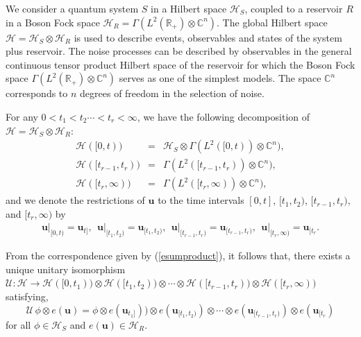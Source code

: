 We consider a quantum system $S$  in a Hilbert space $\mathcal{H}_S$, coupled to a reservoir $R$ in a Boson Fock space $\mathcal{H}_R = \Gamma (L^2 (\mathbb{R}_+) \otimes \mathbb{C}^n)$.  The global Hilbert space $\mathcal{H}=\mathcal{H}_S\otimes\mathcal{H}_R$ is used to describe events, observables and states of the system plus reservoir. The noise processes can be described by observables in the general continuous tensor product Hilbert space of the reservoir for which  the Boson Fock space $\Gamma (L^2 (\mathbb{R}_+)\otimes \mathbb{C}^n)$ serves as one of the simplest models. The space $\mathbb{C}^n$ corresponds to $n$ degrees of freedom in the selection of noise. 

For any $0<t_1<t_2\cdots <t_r<\infty$, we have the following decomposition of $\mathcal{H}=\mathcal{H}_S\otimes \mathcal{H}_R$: 
\begin{eqnarray*}
	\mathcal{H}([0,t))&=&\mathcal{H}_S\otimes \Gamma(L^2([0,t))\otimes \mathbb{C}^n),   \\
	\mathcal{H}([t_{r-1},t_{r})) &=& \Gamma(L^2([t_{r-1},t_{r}))\otimes \mathbb{C}^n), \\
	\mathcal{H}([t_r,\infty)) &=& \Gamma(L^2([t_r,\infty))\otimes \mathbb{C}^n), 														
\end{eqnarray*} 
and we denote the restrictions of $\mathbf{u}$ to the time intervals $[0,t]$, $[t_1,t_2)$, $[t_{r-1},t_{r})$, and $[t_r,\infty)$ by 
\begin{eqnarray*}
	\left.\mathbf{u}\right\vert_{[0,t)}=\mathbf{u}_{t]},  \ \  \left.\mathbf{u}\right\vert_{[t_1,t_2)}=\mathbf{u}_{[t_{1},t_{2})},  \ \ 
	\left.\mathbf{u}\right\vert_{[t_{r-1},t_{r})}=\mathbf{u}_{[t_{r-1},t_{r})},  \ \ 
	\left.\mathbf{u}\right\vert_{[t_r,\infty)}=\mathbf{u}_{[t_r}.
\end{eqnarray*} 

From the correspondence given by (\ref{esumproduct}), it follows that, there exists a unique unitary isomorphism $\mathcal{U}: \mathcal{H} \rightarrow \mathcal{H}([0,t_{1})) \otimes 
\mathcal{H}([t_{1}, t_{2})) \otimes \cdots \otimes \mathcal{H}([t_{r-1},t_{r})) \otimes \mathcal{H}([t_{r},\infty))$ satisfying,     
\begin{equation}
\mathcal{U}\, \phi\otimes e(\mathbf{u}) = \phi\otimes e(\mathbf{u}_{t_1]})) \otimes e(\mathbf{u}_{[t_1,t_2)})\otimes \cdots 
\otimes e(\mathbf{u}_{[t_{r-1},t_r)}) \otimes e(\mathbf{u}_{[t_r})   \label{chap5-eq3.8}
\end{equation}
for all $\phi\in \mathcal{H}_S$ and  $e(\mathbf{u})\in \mathcal{H}_R$. 

